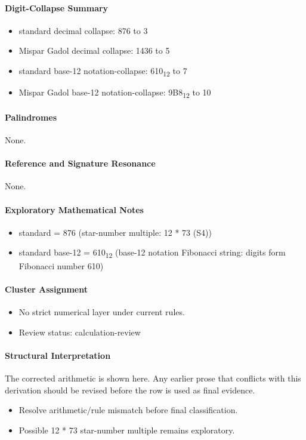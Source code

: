 \paragraph{Digit-Collapse Summary}
\begin{itemize}
\item standard decimal collapse: 876 to 3
\item Mispar Gadol decimal collapse: 1436 to 5
\item standard base-12 notation-collapse: 610\textsubscript{12} to 7
\item Mispar Gadol base-12 notation-collapse: 9B8\textsubscript{12} to 10
\end{itemize}
\paragraph{Palindromes}
None.
\paragraph{Reference and Signature Resonance}
None.
\paragraph{Exploratory Mathematical Notes}
\begin{itemize}
\item standard = 876 (star-number multiple: 12 * 73 (S4))
\item standard base-12 = 610\textsubscript{12} (base-12 notation Fibonacci string: digits form Fibonacci number 610)
\end{itemize}
\paragraph{Cluster Assignment}
\begin{itemize}
\item No strict numerical layer under current rules.
\item Review status: calculation-review
\end{itemize}
\paragraph{Structural Interpretation}
The corrected arithmetic is shown here. Any earlier prose that conflicts with this derivation should be revised before the row is used as final evidence.

\begin{itemize}
\item Resolve arithmetic/rule mismatch before final classification.
\item Possible 12 * 73 star-number multiple remains exploratory.
\end{itemize}

